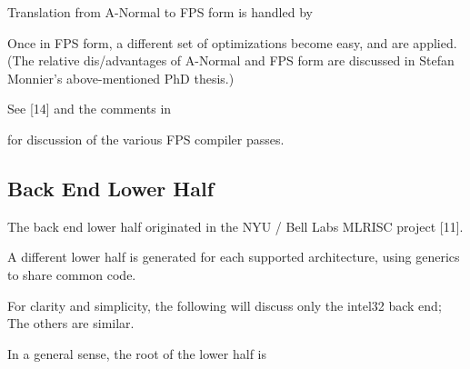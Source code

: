 \begin{quote}
    \newline
\end{quote}


Translation from A-Normal to FPS form is handled by

\begin{quote}
\end{quote}

Once in FPS form, a different set of optimizations become 
easy, and are applied.   (The relative dis/advantages of 
A-Normal and FPS form are discussed in Stefan Monnier's 
above-mentioned PhD thesis.)

See [14] and the comments in

\begin{quote}
\end{quote}

for discussion of the various FPS compiler passes.
\cutend*



\subsection{Back End Lower Half}
\label{section:compiler:backend-lowhalf}

The back end lower half originated in the 
{\sc NYU} / Bell Labs {\sc MLRISC} project [11].

A different lower half is generated for each supported 
architecture, using generics to share common code.

For clarity and simplicity, the following will discuss 
only the intel32 back end;  The others are similar.


In a general sense, the root of the lower half is

\begin{quote}
\end{quote}

